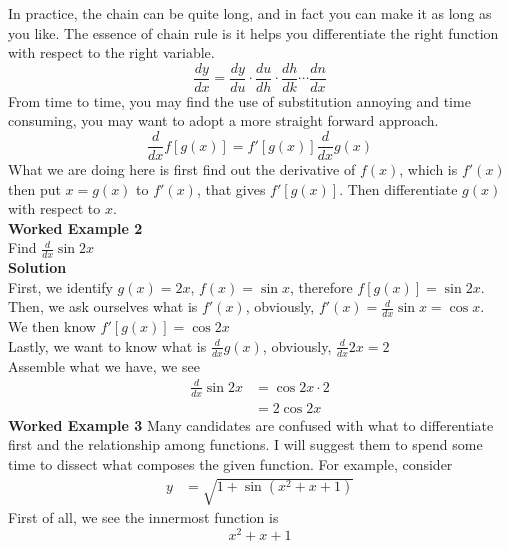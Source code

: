 \documentclass{article}
\begin{document}
In practice, the chain can be quite long,
and in fact you can make it as long as
you like. The essence of chain rule is
it helps you differentiate the right
function with respect to the right
variable.
\begin{equation*}
    \frac{dy}{dx} =\frac{dy}{du} \cdot \frac{du}{dh} \cdot \frac{dh}{dk} \cdots \frac{dn}{dx}
\end{equation*}
From time to time, you may find the use
of substitution annoying and time
consuming, you may want to adopt a
more straight forward approach.
\begin{equation*}
    \frac{d}{dx} f[ g( x)] =f'[ g( x)]\frac{d}{dx} g( x)
\end{equation*}
What we are doing here is first find
out the derivative of
$f(x)$, which is $f'(x)$ then put
$x=g(x)$ to $f'(x)$, that gives
$f'[g(x)]$. Then differentiate
$g(x)$ with respect to $x$.\\
\textbf{Worked Example 2}\\
Find $\displaystyle \frac{d}{dx}\sin{2x}$\\
\textbf{Solution}\\
First, we identify $g(x)=2x$,
$f(x)=\sin{x}$, therefore
$f[g(x)]=\sin{2x}$.\\
Then, we ask ourselves what is
$f'(x)$, obviously, $\displaystyle f'(x)=\frac{d}{dx}\sin{x}=\cos{x}$.\\
We then know $f'[g(x)]=\cos{2x}$\\
Lastly, we want to know what is
$\displaystyle \frac{d}{dx}g(x)$, obviously,
$\displaystyle \frac{d}{dx}2x=2$\\
Assemble what we have, we see
\begin{equation*}
\begin{aligned}
    \frac{d}{dx}\sin 2x & =\cos 2x\cdot 2\\
    & =2\cos 2x
\end{aligned}
\end{equation*}
\textbf{Worked Example 3}
Many candidates are confused with what to
differentiate first and the relationship
among functions. I will suggest them to
spend some time to dissect what composes
the given function. For example,
consider
\begin{equation*}
\begin{aligned}
    y & =\sqrt{1+\sin\left( x^{2} +x+1\right)}
\end{aligned}
\end{equation*}
First of all, we see the innermost function is
\begin{equation*}
    x^{2} +x+1
\end{equation*}
\end{document}
